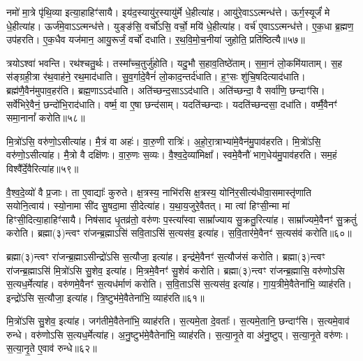 नमो॑ मा॒त्रे पृ॑थि॒व्या इत्या॒हाहिꣳ॑सायै।
इय॑द॒स्यायु॑र॒स्यायु॑र्मे धे॒हीत्या॑ह।
आयु॑रे॒वाऽऽत्मन्ध॑त्ते।
ऊर्ग॒स्यूर्जं॑ मे धे॒हीत्या॑ह।
ऊर्ज॑मे॒वाऽऽत्मन्ध॑त्ते।
युङ्ङ॑सि॒ वर्चो॑ऽसि॒ वर्चो॒ मयि॑ धे॒हीत्या॑ह।
वर्च॑ ए॒वाऽऽत्मन्ध॑त्ते।
ए॒क॒धा ब्र॒ह्मण॒ उप॑हरति।
ए॒क॒धैव यज॑मान॒ आयु॒रूर्जं॒ वर्चो॑ दधाति।
र॒थ॒वि॒मो॒च॒नीया॑ जुहोति॒ प्रति॑\-ष्ठित्यै॥५७॥\ip

त्रयो\-ऽश्वा॑ भवन्ति।
रथ॑श्चतु॒र्थः।
तस्मा᳚च्च॒तुर्जु॑होति।
यदु॒भौ स॒हाव॒तिष्ठे॑ताम्।
स॒मा॒नं लो॒कमि॑याताम्।
स॒ह स॑ङ्ग्रही॒त्रा र॑थ॒वाह॑ने॒ रथ॒माद॑धाति।
सु॒व॒र्गादे॒वैनं॑ लो॒काद॒न्तर्द॑धाति।
ह॒ꣳ॒सः शु॑चि॒षदित्याद॑धाति।
ब्रह्म॑णै॒वैन॑मुपाव॒हर॑ति।
ब्रह्म॒णा\-ऽऽद॑धाति।
अति॑च्छन्द॒सा\-ऽऽद॑धाति।
अति॑च्छन्दा॒ वै सर्वा॑णि॒ छन्दाꣳ॑सि।
सर्वे॑भिरे॒वैनं॒ छन्दो॑भि॒राद॑धाति।
वर्ष्म॒ वा ए॒षा छन्द॑साम्।
यदति॑च्छन्दाः।
यदति॑च्छन्दसा॒ दधा॑ति।
वर्ष्मै॒वैनꣳ॑ समा॒नानां᳚ करोति॥५८॥\ip\anuvakamend[प॒द्य॒न्ते॒ द॒धा॒ति॒ वी॒र्ये॑णेत्या॒हाना᳚त्यै॒ प्रति॑\-ष्ठित्यै॒ ब्रह्म॒णा\-ऽऽद॑धाति स॒प्त च॑]

मि॒त्रो॑ऽसि॒ वरु॑णो॒\-ऽसीत्या॑ह।
मै॒त्रं वा अहः॑।
वा॒रु॒णी रात्रिः॑।
अ॒हो॒रा॒त्राभ्या॑मे॒वैन॑मु॒पाव॑\-हरति।
मि॒त्रो॑ऽसि॒ वरु॑णो॒\-ऽसीत्या॑ह।
मै॒त्रो वै दक्षि॑णः।
वा॒रु॒णः स॒व्यः।
वै॒श्व॒दे॒व्या॑मिक्षा᳚।
स्वमे॒वैनौ॑ भाग॒धेय॑मु॒पाव॑\-हरति।
सम॒हं विश्वै᳚र्दे॒वैरित्या॑ह॥५९॥\ip

वै॒श्व॒दे॒व्यो॑ वै प्र॒जाः।
ता ए॒वाद्याः᳚ कुरुते।
क्ष॒त्रस्य॒ नाभि॑रसि क्ष॒त्रस्य॒ योनि॑र॒सीत्य॑धीवा॒समास्तृ॑णाति सयोनि॒त्वाय॑।
स्यो॒नामा सी॑द सु॒षदा॒मा सी॒देत्या॑ह।
य॒था॒\-य॒जु\-रे॒वै\-तत्।
मा त्वा॑ हिꣳसी॒न्मा मा॑ हिꣳसी॒दित्या॒हाहिꣳ॑सायै।
निष॑साद धृ॒तव्र॑तो॒ वरु॑णः प॒स्त्या᳚स्वा साम्रा᳚ज्याय सु॒क्रतु॒रित्या॑ह।
साम्रा᳚ज्यमे॒वैनꣳ॑ सु॒क्रतुं॑ करोति।
ब्रह्मा(३)न्त्वꣳ रा॑जन्ब्र॒ह्माऽसि॑ सवि॒ताऽसि॑ स॒त्यस॑व॒ इत्या॑ह।
स॒वि॒तार॑मे॒वैनꣳ॑ स॒त्यस॑वं करोति॥६०॥\ip

ब्रह्मा(३)न्त्वꣳ रा॑जन्ब्र॒ह्मा\-ऽसीन्द्रो॑ऽसि स॒त्यौजा॒ इत्या॑ह।
इन्द्र॑मे॒वैनꣳ॑ स॒त्यौज॑सं करोति।
ब्रह्मा(३)न्त्वꣳ रा॑जन्ब्र॒ह्माऽसि॑ मि॒त्रो॑ऽसि सु॒शेव॒ इत्या॑ह।
मि॒त्रमे॒वैनꣳ॑ सु॒शेवं॑ करोति।
ब्रह्मा(३)न्त्वꣳ रा॑जन्ब्र॒ह्मासि॒ वरु॑णोऽसि स॒त्यध॒र्मेत्या॑ह।
वरु॑णमे॒वैनꣳ॑ स॒त्यध॑र्माणं करोति।
स॒वि॒ताऽसि॑ स॒त्यस॑व॒ इत्या॑ह।
गा॒य॒त्रीमे॒वैतेना॑भि॒ व्याह॑रति।
इन्द्रो॑ऽसि स॒त्यौजा॒ इत्या॑ह।
त्रि॒ष्टुभ॑मे॒वैतेना॑भि॒ व्याह॑रति॥६१॥\ip

मि॒त्रो॑ऽसि सु॒शेव॒ इत्या॑ह।
जग॑तीमे॒वैतेना॑भि॒ व्याह॑रति।
स॒त्यमे॒ता दे॒वताः᳚।
स॒त्यमे॒तानि॒ छन्दाꣳ॑सि।
स॒त्यमे॒वाव॑\- रुन्धे।
वरु॑णोऽसि स॒त्यध॒र्मेत्या॑ह।
अ॒नु॒ष्टुभ॑मे॒वैतेना॑भि॒ व्याह॑रति।
स॒त्या॒नृ॒ते वा अ॑नु॒ष्टुप्।
स॒त्या॒नृ॒ते वरु॑णः।
स॒त्या॒नृ॒ते ए॒वाव॑ रुन्धे॥६२॥\ip

